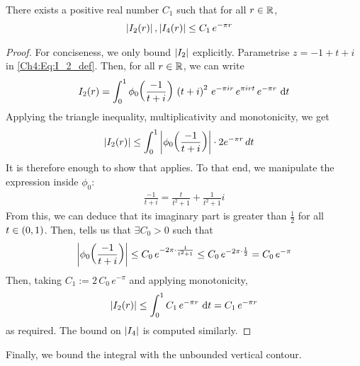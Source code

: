 \begin{boxlemma}\label{Ch4:Lemma:Bound_I2_I4}
    There exists a positive real number $C_1$ such that for all $r \in \mathbb{R}$,
    \begin{align*}
        \left\lvert I_2(r) \right\rvert, \left\lvert I_4(r) \right\rvert &\leq C_1 \, e^{-\pi r}
    \end{align*}
\end{boxlemma}
\begin{proof}
    For conciseness, we only bound $\left\lvert I_2 \right\rvert$ explicitly. Parametrise $z = -1 + t + i$ in \eqref{Ch4:Eq:I_2_def}. Then, for all $r \in \mathbb{R}$, we can write
    \begin{align*}
        I_2(r) = \int_{0}^{1}
            \phi_0\!\left( \frac{-1}{t + i} \right) \,
            \left( t + i \right)^2 \,
            e^{-\pi i r} \,
            e^{\pi i r t} \,
            e^{-\pi r} \,
            \operatorname{d}\!{t}
    \end{align*}
    Applying the triangle inequality, multiplicativity and monotonicity, we get
    \begin{align*}
        \left\lvert I_2(r) \right\rvert &\leq \int_{0}^{1} \left\lvert \phi_0\!\left( \frac{-1}{t + i} \right) \right\rvert \cdot 2e^{-\pi r} \, dt
    \end{align*}
    It is therefore enough to show that  applies. To that end, we manipulate the expression inside $\phi_0$:
    \begin{align*}
        \frac{-1}{t + i} = \frac{t}{t^2 + 1} + \frac{1}{t^2 + 1}i
    \end{align*}
    From this, we can deduce that its imaginary part is greater than $\frac{1}{2}$ for all $t \in \left( 0, 1 \right)$. Then,  tells us that $\exists C_0 > 0$ such that
    \begin{align*}
        \left\lvert \phi_0\!\left( \frac{-1}{t + i} \right) \right\rvert
        \leq C_0 \, e^{-2 \pi \cdot \frac{1}{t^2 + 1}}
        \leq C_0 \, e^{-2\pi \cdot \frac{1}{2}} = C_0 \, e^{-\pi}
    \end{align*}
    Then, taking $C_1 := 2 \, C_0 \, e^{-\pi}$ and applying monotonicity,
    \begin{align*}
        \left\lvert I_2(r) \right\rvert \leq \int_{0}^{1} C_1 \, e^{-\pi r} \, \operatorname{d}\!{t} = C_1 \, e^{-\pi r}
    \end{align*}
    as required. The bound on $\left\lvert I_4 \right\rvert$ is computed similarly.
\end{proof}

Finally, we bound the integral with the unbounded vertical contour.

